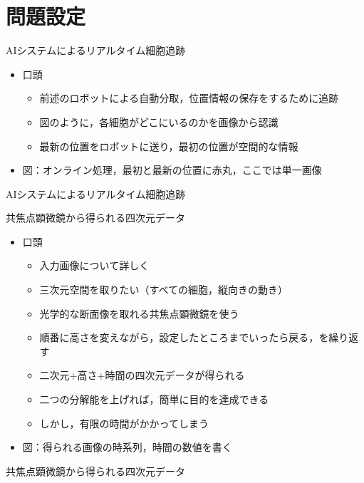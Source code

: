 \section{問題設定}

\begin{frame}[noframenumbering]{AIシステムによるリアルタイム細胞追跡}
    \begin{itemize}
        \item 口頭
        \begin{itemize}
            \item 前述のロボットによる自動分取，位置情報の保存をするために追跡
            \item 図のように，各細胞がどこにいるのかを画像から認識
            \item 最新の位置をロボットに送り，最初の位置が空間的な情報
        \end{itemize}
        \item 図：オンライン処理，最初と最新の位置に赤丸，ここでは単一画像
    \end{itemize}
\end{frame}
\begin{frame}{AIシステムによるリアルタイム細胞追跡}
\end{frame}

\begin{frame}[noframenumbering]{共焦点顕微鏡から得られる四次元データ}
    \begin{itemize}
        \item 口頭
        \begin{itemize}
            \item 入力画像について詳しく
            \item 三次元空間を取りたい（すべての細胞，縦向きの動き）
            \item 光学的な断面像を取れる共焦点顕微鏡を使う
            \item 順番に高さを変えながら，設定したところまでいったら戻る，を繰り返す
            \item 二次元+高さ+時間の四次元データが得られる
            \item 二つの分解能を上げれば，簡単に目的を達成できる
            \item しかし，有限の時間がかかってしまう
        \end{itemize}
        \item 図：得られる画像の時系列，時間の数値を書く
    \end{itemize}
\end{frame}
\begin{frame}{共焦点顕微鏡から得られる四次元データ}
\end{frame}

